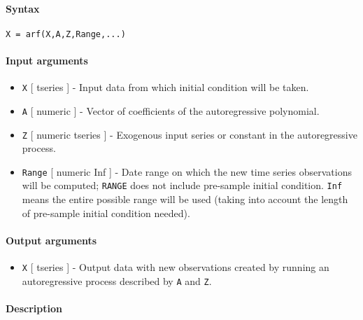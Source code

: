 


	\paragraph{Syntax}\label{syntax}

\begin{verbatim}
X = arf(X,A,Z,Range,...)
\end{verbatim}

\paragraph{Input arguments}\label{input-arguments}

\begin{itemize}
\item
  \texttt{X} {[} tseries {]} - Input data from which initial condition
  will be taken.
\item
  \texttt{A} {[} numeric {]} - Vector of coefficients of the
  autoregressive polynomial.
\item
  \texttt{Z} {[} numeric \textbar{} tseries {]} - Exogenous input series
  or constant in the autoregressive process.
\item
  \texttt{Range} {[} numeric \textbar{} Inf {]} - Date range on which
  the new time series observations will be computed; \texttt{RANGE} does
  not include pre-sample initial condition. \texttt{Inf} means the
  entire possible range will be used (taking into account the length of
  pre-sample initial condition needed).
\end{itemize}

\paragraph{Output arguments}\label{output-arguments}

\begin{itemize}
\itemsep1pt\parskip0pt
\item
  \texttt{X} {[} tseries {]} - Output data with new observations created
  by running an autoregressive process described by \texttt{A} and
  \texttt{Z}.
\end{itemize}

\paragraph{Description}\label{description}

